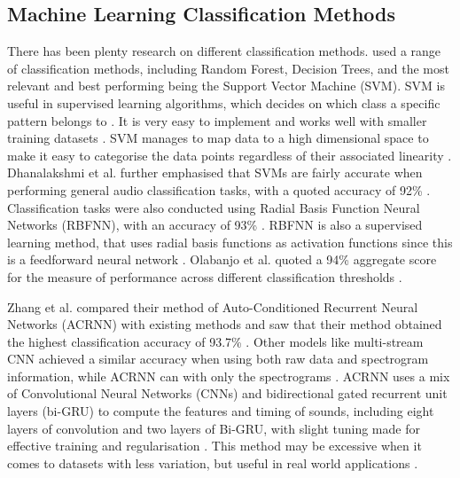 \documentclass[class=report,11pt,crop=false]{standalone}
\begin{document}
\subsection{Machine Learning Classification Methods} \label{ss: MLCM}

There has been plenty research on different classification methods. \cite{Vimal_2021} used a range of classification methods, including Random Forest, Decision Trees, and the most relevant and best performing being the Support Vector Machine (SVM). SVM is useful in supervised learning algorithms, which decides on which class a specific pattern belongs to \cite{Vimal_2021}. It is very easy to implement and works well with smaller training datasets \cite{Vimal_2021}. SVM manages to map data to a high dimensional space to make it easy to categorise the data points regardless of their associated linearity \cite{Vimal_2021}. Dhanalakshmi et al. further emphasised that SVMs are fairly accurate when performing general audio classification tasks, with a quoted accuracy of 92\% \cite{Dhanalakshmi_2009}. Classification tasks were also conducted using Radial Basis Function Neural Networks (RBFNN), with an accuracy of 93\% \cite{Dhanalakshmi_2009}. RBFNN is also a supervised learning method, that uses radial basis functions as activation functions since this is a feedforward neural network \cite{Dhanalakshmi_2009}. Olabanjo et al. quoted a 94\% aggregate score for the measure of performance across different classification thresholds \cite{Olabanjo_2022}. 

Zhang et al. compared their method of Auto-Conditioned Recurrent Neural Networks (ACRNN) with existing methods and saw that their method obtained the highest classification accuracy of 93.7\% \cite{Zhang2021}. Other models like multi-stream CNN achieved a similar accuracy when using both raw data and spectrogram information, while ACRNN can with only the spectrograms \cite{Zhang2021}. ACRNN uses a mix of Convolutional Neural Networks (CNNs) and bidirectional gated recurrent unit layers (bi-GRU) to compute the features and timing of sounds, including eight layers of convolution and two layers of Bi-GRU, with slight tuning made for effective training and regularisation \cite{Zhang2021}. This method may be excessive when it comes to datasets with less variation, but useful in real world applications \cite{Zhang2021}. 
\end{document}
